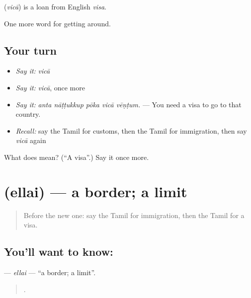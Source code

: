 \begin{cousinweb}
\textbf{} (\emph{vicā}) is a loan from English \emph{visa}.
\end{cousinweb}

\begin{grammarlens}[title={What you've built}]
One more word for getting around.
\end{grammarlens}

\subsection*{Your turn}
\begin{itemize}
\raggedright
  \item \emph{Say it:} \emph{vicā}
  \item \emph{Say it:} \emph{vicā}, once more
  \item \emph{Say it:} \emph{anta nāṭṭukkup pōka vicā vēṇṭum.} — You need a visa to go to that country.
  \item \emph{Recall:} say the Tamil for customs, then the Tamil for immigration, then say \emph{vicā} again
\end{itemize}

\begin{tcolorbox}[breakable,colback=teal!4,colframe=teal!35!black,title={Before you move on}]
What does  mean? (\textquotedblleft{}A visa\textquotedblright{}.) Say it once more.
\end{tcolorbox}
\section[\texorpdfstring{\ta{எல்லை} (ellai)}{எல்லை (ellai)}]{ (ellai) — a border; a limit}

\label{lesson:TA-C414-ellai}



\begin{quote}
Before the new one: say the Tamil for immigration, then the Tamil for a visa.
\end{quote}

\subsection*{You'll want to know: }
\textbf{} — \emph{ellai} — \textquotedblleft{}a border; a limit\textquotedblright{}.

\begin{quote}
   .
\end{quote}

